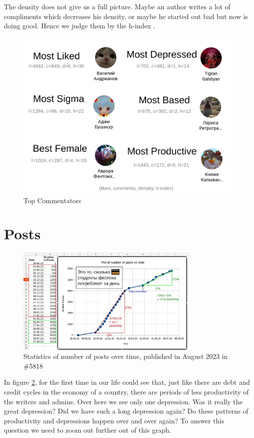 \documentclass[
	12pt
] {article}
\begin{document}
	The density does not give us a full picture. Maybe an author writes a lot of compliments which decreases his density, or maybe he started out bad but now is doing good. Hence we judge them by the h-index \cite{wikipedia-hindex}.
	
	\newpage
	\vspace*{\fill}
	\begin{figure}[H]
		\centering
		\includegraphics[width=\textwidth]{fig-authors-summary-pic}
		\caption{Top Commentators}
		\label{fig-authors-summary-pic}
	\end{figure}
	\vfill
	
\newpage
\section{Posts}
	\begin{figure}[H]
		\centering
		\includegraphics[width=0.8\textwidth]{fig-old-count-post-time}
		\caption{Statistics of number of posts over time, published in August 2023 in \#5818 \cite{vk-link-old-stats}}
		\label{fig-old-count-post-time}
	\end{figure}
	In figure \ref{fig-old-count-post-time}, for the first time in our life could see that, just like there are debt and credit cycles in the economy of a country, there are periods of less productivity of the writers and admins. Over here we see only one depression. Was it really the great depression? Did we have such a long depression again? Do these patterns of productivity and depressions happen over and over again? To answer this question we need to zoom out further out of this graph.
\end{document}
